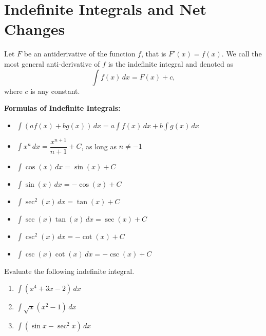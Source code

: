 
\hypertarget{indefinite-integrals-and-net-changes}{%
\section{Indefinite Integrals and Net
Changes}\label{indefinite-integrals-and-net-changes}}

\begin{definition}

Let \(F\) be an antiderivative of the function \(f\), that is
\(F'(x)=f(x)\). We call the most general anti-derivative of \(f\) is the
indefinite integral and denoted as \[\int{{f(x)\,dx}} = F(x) + c,\]
where \(c\) is any constant.

\end{definition}

\textbf{Formulas of Indefinite Integrals:}

\begin{itemize}
\item
  \(\displaystyle \int\left(af( x )+bg(x)\right)\,dx = a\int f( x )\,dx + b\int g( x )\,dx\)
\item
  \(\displaystyle \int x^n \,dx = \dfrac{x^{n+1}}{n+1} + C\), as long as
  \(n \ne -1\)
\item
  \(\displaystyle \int \cos(x) \, dx = \sin(x) + C\)
\item
  \(\displaystyle \int \sin(x) \, dx = - \cos(x) + C\)
\item
  \(\displaystyle \int \sec^2(x) \, dx = \tan(x) + C\)
\item
  \(\displaystyle \int \sec(x) \tan(x) \, dx = \sec(x) + C\)
\item
  \(\displaystyle \int \csc^2(x) \, dx = - \cot(x) + C\)
\item
  \(\displaystyle \int \csc(x)\cot(x) \, dx = -\csc(x) + C\)
\end{itemize}

\begin{example}

Evaluate the following indefinite integral.

\begin{enumerate}
\item
  \(\displaystyle\int (x^4 + 3x - 2)\,dx\)
\item
  \(\displaystyle\int\sqrt{x}(x^2 - 1)\,dx\)
\item
  \(\displaystyle\int (\sin x-\sec^2 x)\,dx\)
\end{enumerate}

\end{example}

